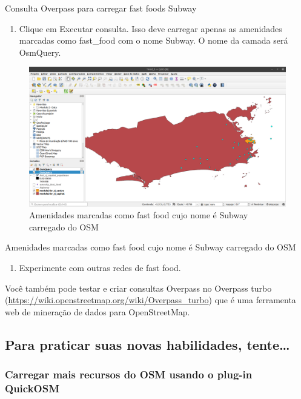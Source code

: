\documentclass[
]{book}
\providecommand{\tightlist}{%
  \setlength{\itemsep}{0pt}\setlength{\parskip}{0pt}}
\begin{document}
Consulta Overpass para carregar fast foods Subway

\begin{enumerate}
\def\labelenumi{\arabic{enumi}.}
\setcounter{enumi}{3}
\tightlist
\item
  Clique em Executar consulta. Isso deve carregar apenas as amenidades marcadas como fast\_food com o nome Subway. O nome da camada será OsmQuery.
\end{enumerate}

\begin{figure}
\centering
\includegraphics{media/modulo3/overpass-3.png}
\caption{Amenidades marcadas como fast food cujo nome é Subway carregado do OSM}
\end{figure}

Amenidades marcadas como fast food cujo nome é Subway carregado do OSM

\begin{enumerate}
\def\labelenumi{\arabic{enumi}.}
\setcounter{enumi}{4}
\tightlist
\item
  Experimente com outras redes de fast food.
\end{enumerate}

Você também pode testar e criar consultas Overpass no Overpass turbo (\url{https://wiki.openstreetmap.org/wiki/Overpass_turbo}) que é uma ferramenta web de mineração de dados para OpenStreetMap.

\hypertarget{para-praticar-suas-novas-habilidades-tente-3}{%
\subsection{Para praticar suas novas habilidades, tente\ldots{}}\label{para-praticar-suas-novas-habilidades-tente-3}}

\hypertarget{carregar-mais-recursos-do-osm-usando-o-plug-in-quickosm}{%
\subsubsection{\texorpdfstring{\textbf{Carregar mais recursos do OSM usando o plug-in QuickOSM}}{Carregar mais recursos do OSM usando o plug-in QuickOSM}}\label{carregar-mais-recursos-do-osm-usando-o-plug-in-quickosm}}
\end{document}

